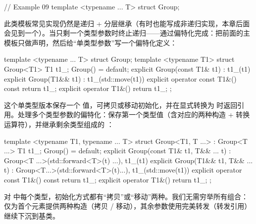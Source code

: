 \begin{code}
// Example 09
template <typename ... T> struct Group;
\end{code}

此类模板常见实现仍然是递归 + 分层继承（有时也能写成非递归实现，本章后面会见到一个）。当只剩一个类型参数时终止递归——通过偏特化完成：把前面的主模板只做声明，然后给“单类型参数”写一个偏特化定义：

\begin{code}
template <typename ... T> struct Group;
template <typename T1> struct Group<T1> {
  T1 t1_;
  Group() = default;
  explicit Group(const T1& t1) : t1_(t1) {}
  explicit Group(T1&& t1) : t1_(std::move(t1)) {}
  explicit operator const T1&() const { return t1_; }
  explicit operator T1&() { return t1_; }
};
\end{code}

这个单类型版本保存一个  值，可拷贝或移动初始化，并在显式转换为  时返回引用。处理多个类型参数的偏特化：保存第一个类型值（含对应的两种构造 + 转换运算符），并继承剩余类型组成的 ：

\begin{code}
template <typename T1, typename ... T>
struct Group<T1, T ...> : Group<T ...> {
  T1 t1_;
  Group() = default;
  explicit Group(const T1& t1, T&& ... t) :
    Group<T ...>(std::forward<T>(t) ...), t1_(t1) {}
  explicit Group(T1&& t1, T&& ... t) :
    Group<T...>(std::forward<T>(t)...),
                t1_(std::move(t1)) {}
  explicit operator const T1&() const { return t1_; }
  explicit operator T1&() { return t1_; }
};
\end{code}

对  中每个类型，初始化方式都有“拷贝”或“移动”两种。我们无需穷举所有组合：仅为首个元素提供两种构造（拷贝 / 移动），其余参数使用完美转发（转发引用）继续下沉到基类。

